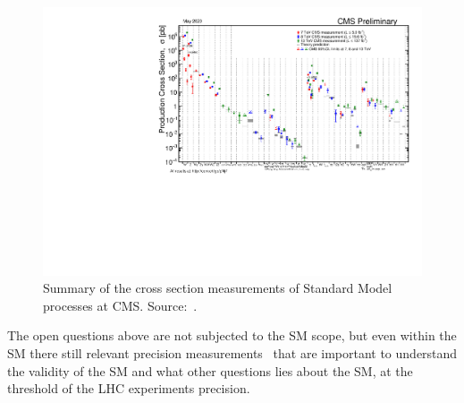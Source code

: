 \begin{figure}
  \centering
  \includegraphics[width=\textwidth]{figures_and_tables/theory/cms_sm_xsec.pdf}
  \caption{Summary of the cross section measurements of Standard Model processes at CMS. Source:~\cite{cms_sm_xsec_summary}.}
  \label{cms_sm_xsec}
\end{figure}

The open questions above are not subjected to the SM scope, but even within the SM there still relevant precision measurements~\cite{sm_global_fit} that are important to understand the validity of the SM and what other questions lies about the SM, at the threshold of the LHC experiments precision.

\clearpage 